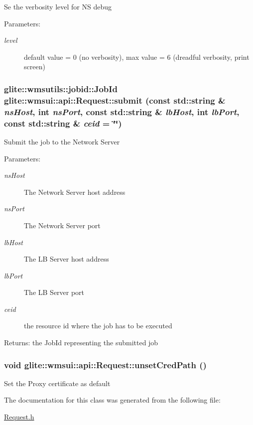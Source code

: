 Se the verbosity level for NS debug \begin{Desc}
\item[Parameters:]
\begin{description}
\item[{\em level}]default value = 0 (no verbosity), max value = 6 (dreadful verbosity, print screen) \end{description}
\end{Desc}
\hypertarget{classglite_1_1wmsui_1_1api_1_1Request_z13_2}{
\subsubsection[submit]{\setlength{\rightskip}{0pt plus 5cm}glite::wmsutils::jobid::Job\-Id glite::wmsui::api::Request::submit (const std::string \& {\em ns\-Host}, int {\em ns\-Port}, const std::string \& {\em lb\-Host}, int {\em lb\-Port}, const std::string \& {\em ceid} = \char`\"{}\char`\"{})}}
\label{classglite_1_1wmsui_1_1api_1_1Request_z13_2}


Submit the job to the Network Server \begin{Desc}
\item[Parameters:]
\begin{description}
\item[{\em ns\-Host}]The Network Server host address \item[{\em ns\-Port}]The Network Server port \item[{\em lb\-Host}]The LB Server host address \item[{\em lb\-Port}]The LB Server port \item[{\em ceid}]the resource id where the job has to be executed \end{description}
\end{Desc}
\begin{Desc}
\item[Returns:]the Job\-Id representing the submitted job\end{Desc}
\hypertarget{classglite_1_1wmsui_1_1api_1_1Request_z11_1}{
\subsubsection[unsetCredPath]{\setlength{\rightskip}{0pt plus 5cm}void glite::wmsui::api::Request::unset\-Cred\-Path ()}}
\label{classglite_1_1wmsui_1_1api_1_1Request_z11_1}


Set the Proxy certificate as default 

The documentation for this class was generated from the following file:\begin{CompactItemize}
\item 
\hyperlink{Request_8h}{Request.h}\end{CompactItemize}
